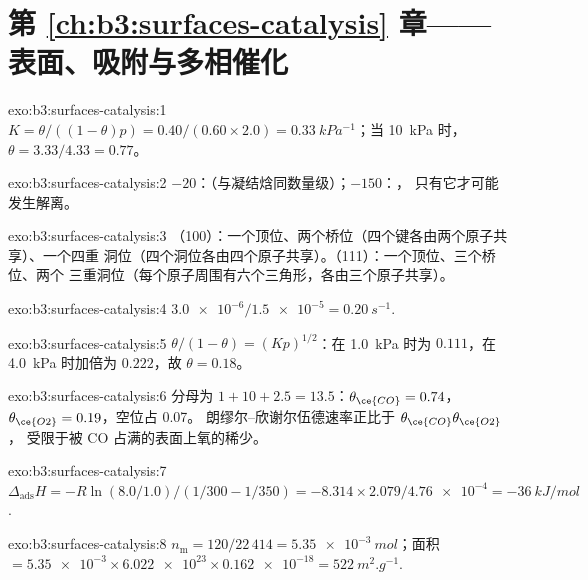 \section*{第 \ref{ch:b3:surfaces-catalysis} 章——表面、吸附与多相催化}

\begin{solution}{exo:b3:surfaces-catalysis:1}
$K = \theta/((1 - \theta)p) = 0.40/(0.60 \times 2.0) = \qty{0.33}{kPa^{-1}}$；当 \qty{10}{kPa} 时，$\theta = 3.33/4.33 = 0.77$。
\end{solution}

\begin{solution}{exo:b3:surfaces-catalysis:2}
$-20$：（与凝结焓同数量级）；$-150$：，
只有它才可能发生解离。
\end{solution}

\begin{solution}{exo:b3:surfaces-catalysis:3}
（100）：一个顶位、两个桥位（四个键各由两个原子共享）、一个四重
洞位（四个洞位各由四个原子共享）。（111）：一个顶位、三个桥位、两个
三重洞位（每个原子周围有六个三角形，各由三个原子共享）。
\end{solution}

\begin{solution}{exo:b3:surfaces-catalysis:4}
$\num{3.0e-6}/\num{1.5e-5} = \qty{0.20}{s^{-1}}$.
\end{solution}

\begin{solution}{exo:b3:surfaces-catalysis:5}
$\theta/(1 - \theta) = (Kp)^{1/2}$：在 \qty{1.0}{kPa} 时为 $0.111$，在 \qty{4.0}{kPa} 时加倍为 $0.222$，故 $\theta = 0.18$。
\end{solution}

\begin{solution}{exo:b3:surfaces-catalysis:6}
分母为 $1 + 10 + 2.5 = 13.5$：$\theta_{\ce{CO}} = 0.74$，$\theta_{\ce{O2}} = 0.19$，空位占 0.07。
朗缪尔–欣谢尔伍德速率正比于 $\theta_{\ce{CO}}\theta_{\ce{O2}}$，
受限于被 CO 占满的表面上氧的稀少。
\end{solution}

\begin{solution}{exo:b3:surfaces-catalysis:7}
$\Delta_{\mathrm{ads}}H = -R\ln(8.0/1.0)/(1/300 - 1/350) = -8.314 \times 2.079/\num{4.76e-4} = \qty{-36}{kJ/mol}$.
\end{solution}

\begin{solution}{exo:b3:surfaces-catalysis:8}
$n_{\mathrm m} = 120/22\,414 = \qty{5.35e-3}{mol}$；面积 $= \num{5.35e-3} \times \num{6.022e23} \times \num{0.162e-18} =
\qty{522}{m^2.g^{-1}}$.
\end{solution}

